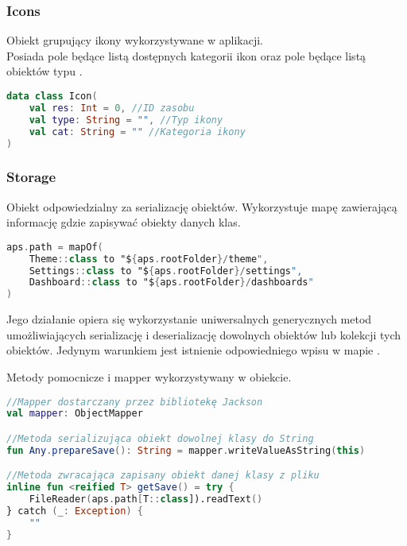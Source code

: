 \subsubsection{Icons}
Obiekt grupujący ikony wykorzystywane w aplikacji.\\
Posiada pole  będące listą dostępnych kategorii ikon oraz pole  będące listą obiektów typu .

\begin{lstlisting}[language=Kotlin]
data class Icon(
    val res: Int = 0, //ID zasobu
    val type: String = "", //Typ ikony
    val cat: String = "" //Kategoria ikony
)
\end{lstlisting}

\newpage

\subsubsection{Storage}
Obiekt odpowiedzialny za serializację obiektów. Wykorzystuje mapę  zawierającą informację gdzie zapisywać obiekty danych klas.

\begin{lstlisting}[language=Kotlin]
aps.path = mapOf(
    Theme::class to "${aps.rootFolder}/theme",
    Settings::class to "${aps.rootFolder}/settings",
    Dashboard::class to "${aps.rootFolder}/dashboards"
)
\end{lstlisting}

\vspace{1em}

Jego działanie opiera się wykorzystanie uniwersalnych generycznych metod umożliwiających serializację i deserializację dowolnych obiektów lub kolekcji tych obiektów. Jedynym warunkiem jest istnienie odpowiedniego wpisu w mapie .\\

\vspace{1em}

Metody pomocnicze i mapper wykorzystywany w obiekcie.

\begin{lstlisting}[language=Kotlin]
//Mapper dostarczany przez bibliotekę Jackson
val mapper: ObjectMapper

//Metoda serializująca obiekt dowolnej klasy do String
fun Any.prepareSave(): String = mapper.writeValueAsString(this)

//Metoda zwracająca zapisany obiekt danej klasy z pliku
inline fun <reified T> getSave() = try {
    FileReader(aps.path[T::class]).readText()
} catch (_: Exception) {
    ""
}
\end{lstlisting}

